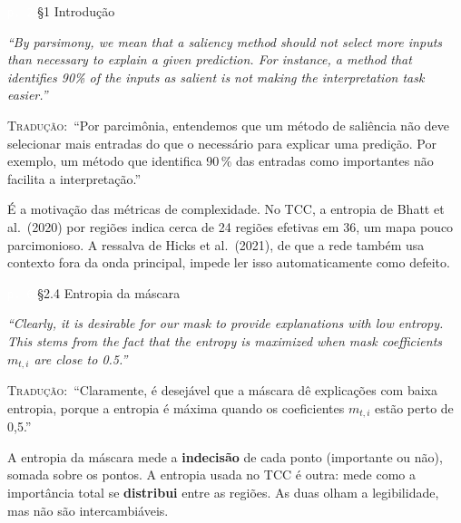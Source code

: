 \documentclass[11pt,a4paper]{article}
\newcommand{\pagechip}[1]{{\setlength{\fboxsep}{1.5pt}\colorbox{cAcc}{\textcolor{white}{\scriptsize\texttt{#1}}}}}
\newenvironment{origquote}{\par\itshape\small}{\par}
\newenvironment{tradquote}{\par\small\textsc{Tradução:}\ }{\par}
\newcommand{\explab}[1]{\par\smallskip{\small\color{cAcc}\textbf{\MakeUppercase{#1}}}\par}
\begin{document}
\begin{citacard}{\pagechip{p. 2} §1 Introdução}
\begin{origquote}“By parsimony, we mean that a saliency method should not select more inputs than necessary to explain a given prediction. For instance, a method that identifies 90\% of the inputs as salient is not making the interpretation task easier.”\end{origquote}
\begin{tradquote}“Por parcimônia, entendemos que um método de saliência não deve selecionar mais entradas do que o necessário para explicar uma predição. Por exemplo, um método que identifica 90\,\% das entradas como importantes não facilita a interpretação.”\end{tradquote}
\explab{Explicação}
É a motivação das métricas de complexidade. No TCC, a entropia de Bhatt et al.\ (2020) por regiões indica cerca de 24 regiões efetivas em 36, um mapa pouco parcimonioso. A ressalva de Hicks et al.\ (2021), de que a rede também usa contexto fora da onda principal, impede ler isso automaticamente como defeito.
\end{citacard}

\begin{citacard}{\pagechip{p. 6} §2.4 Entropia da máscara}
\begin{origquote}“Clearly, it is desirable for our mask to provide explanations with low entropy. This stems from the fact that the entropy is maximized when mask coefficients $m_{t,i}$ are close to 0.5.”\end{origquote}
\begin{tradquote}“Claramente, é desejável que a máscara dê explicações com baixa entropia, porque a entropia é máxima quando os coeficientes $m_{t,i}$ estão perto de 0,5.”\end{tradquote}
\explab{Explicação}
A entropia da máscara mede a \textbf{indecisão} de cada ponto (importante ou não), somada sobre os pontos. A entropia usada no TCC é outra: mede como a importância total se \textbf{distribui} entre as regiões. As duas olham a legibilidade, mas não são intercambiáveis.
\end{citacard}
\end{document}
